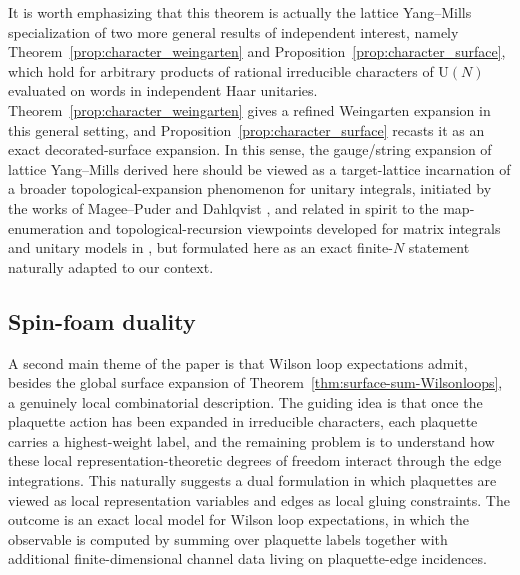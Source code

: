 \documentclass[11pt,a4paper,reqno]{article}
\theoremstyle{definition}
\theoremstyle{remark}
\newcommand\U{{\mathrm U}}
\begin{document}
It is worth emphasizing that this theorem is actually the lattice Yang--Mills specialization of two more general results of independent interest, namely Theorem~\ref{prop:character_weingarten} and Proposition~\ref{prop:character_surface}, which hold for arbitrary products of rational irreducible characters of $\U(N)$ evaluated on words in independent Haar unitaries. Theorem~\ref{prop:character_weingarten} gives a refined Weingarten expansion in this general setting, and Proposition~\ref{prop:character_surface} recasts it as an exact decorated-surface expansion. In this sense, the gauge/string expansion of lattice Yang--Mills derived here should be viewed as a target-lattice incarnation of a broader topological-expansion phenomenon for unitary integrals, initiated by the works of Magee--Puder \cite{MagPud19,Mag2,MdlS26} and Dahlqvist \cite{Dah26}, and related in spirit to the map-enumeration and topological-recursion viewpoints developed for matrix integrals and unitary models in \cite{GuionnetMaurelSegala2006,CollinsGuionnetMaurelSegala2009,GuionnetNovak2015,BucDalche2026}, but formulated here as an exact finite-$N$ statement naturally adapted to our context.

\subsection{Spin-foam duality}

A second main theme of the paper is that Wilson loop expectations admit, besides the global surface expansion of Theorem~\ref{thm:surface-sum-Wilsonloops}, a genuinely local combinatorial description. The guiding idea is that once the plaquette action has been expanded in irreducible characters, each plaquette carries a highest-weight label, and the remaining problem is to understand how these local representation-theoretic degrees of freedom interact through the edge integrations. This naturally suggests a dual formulation in which plaquettes are viewed as local representation
variables and edges as local gluing constraints. The outcome is an exact local model for Wilson loop expectations, in which the observable is computed by summing over plaquette labels together with additional finite-dimensional channel data living on plaquette-edge incidences.
\end{document}
